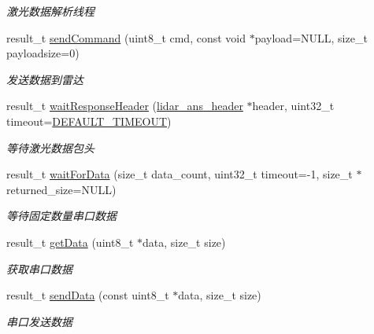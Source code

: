 \begin{DoxyCompactItemize}
\begin{DoxyCompactList}\small\item\em 激光数据解析线程 ~\newline
\end{DoxyCompactList}\item 
result\+\_\+t \hyperlink{classydlidar_1_1_y_dlidar_driver_ab096ecdc3642c04e3e8b000e210c0962}{send\+Command} (uint8\+\_\+t cmd, const void $\ast$payload=N\+U\+LL, size\+\_\+t payloadsize=0)
\begin{DoxyCompactList}\small\item\em 发送数据到雷达 ~\newline
\end{DoxyCompactList}\item 
result\+\_\+t \hyperlink{classydlidar_1_1_y_dlidar_driver_a0e089d615193ccef4bf488f63ff8130e}{wait\+Response\+Header} (\hyperlink{structlidar__ans__header}{lidar\+\_\+ans\+\_\+header} $\ast$header, uint32\+\_\+t timeout=\hyperlink{classydlidar_1_1_y_dlidar_driver_a13a4f2dc4067b43794b2c47c06d5d27aa07c79ce96f468ff4b40495ef84584442}{D\+E\+F\+A\+U\+L\+T\+\_\+\+T\+I\+M\+E\+O\+UT})
\begin{DoxyCompactList}\small\item\em 等待激光数据包头 ~\newline
\end{DoxyCompactList}\item 
result\+\_\+t \hyperlink{classydlidar_1_1_y_dlidar_driver_a03cb9fc8c33f9486182b44ac97690868}{wait\+For\+Data} (size\+\_\+t data\+\_\+count, uint32\+\_\+t timeout=-\/1, size\+\_\+t $\ast$returned\+\_\+size=N\+U\+LL)
\begin{DoxyCompactList}\small\item\em 等待固定数量串口数据 ~\newline
\end{DoxyCompactList}\item 
result\+\_\+t \hyperlink{classydlidar_1_1_y_dlidar_driver_ad787e714bc05e5a70a42b096e632c60f}{get\+Data} (uint8\+\_\+t $\ast$data, size\+\_\+t size)
\begin{DoxyCompactList}\small\item\em 获取串口数据 ~\newline
\end{DoxyCompactList}\item 
result\+\_\+t \hyperlink{classydlidar_1_1_y_dlidar_driver_a998ba4b05927d19e8a0d4d29d3d47656}{send\+Data} (const uint8\+\_\+t $\ast$data, size\+\_\+t size)
\begin{DoxyCompactList}\small\item\em 串口发送数据 ~\newline

\end{DoxyCompactList}
\end{DoxyCompactItemize}
